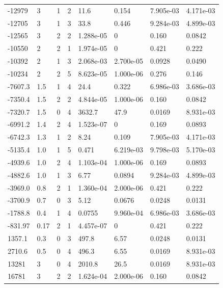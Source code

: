 \documentclass[preview]{standalone}
\begin{document}
{{\begin{tabular}{L{1.2cm}C{1.2cm} C{0.3cm}C{0.5cm} C{1.4cm}C{1.4cm} C{1.4cm}C{1.4cm}}
  -12979  &     3  & 1     &  2 &  11.6  & 0.154  & 7.905e-03 &  4.171e-03   \\ 
  -12705  &     3  & 1     &  3 &  33.8  & 0.446  & 9.284e-03 &  4.899e-03   \\ 
  -12565  &     3  & 2     &  2 &  1.288e-05  & 0  & 0.160 &  0.0842   \\ 
  -10550  &     2  & 2     &  1 &  1.974e-05  & 0  & 0.421 &  0.222   \\ 
  -10392  &     2  & 1     &  3 &  2.068e-03  & 2.700e-05  & 0.0928 &  0.0490   \\ 
  -10234  &     2  & 2     &  5 &  8.623e-05  & 1.000e-06  & 0.276 &  0.146   \\ 
  -7607.3  &   1.5  & 1     &  4 &  24.4  & 0.322  & 6.986e-03 &  3.686e-03   \\ 
  -7350.4  &   1.5  & 2     &  2 &  4.844e-05  & 1.000e-06  & 0.160 &  0.0842   \\ 
  -7320.7  &   1.5  & 0     &  4 &  3632.7  & 47.9  & 0.0169 &  8.931e-03   \\ 
  -6991.2  &   1.4  & 2     &  4 &  1.523e-07  & 0  & 0.169 &  0.0893   \\ 
  -6742.3  &   1.3  & 1     &  2 &  8.24  & 0.109  & 7.905e-03 &  4.171e-03   \\ 
  -5135.4  &   1.0  & 1     &  5 &  0.471  & 6.219e-03  & 9.798e-03 &  5.170e-03   \\ 
  -4939.6  &   1.0  & 2     &  4 &  1.103e-04  & 1.000e-06  & 0.169 &  0.0893   \\ 
  -4882.6  &   1.0  & 1     &  3 &  6.77  & 0.0894  & 9.284e-03 &  4.899e-03   \\ 
  -3969.0  &   0.8  & 2     &  1 &  1.360e-04  & 2.000e-06  & 0.421 &  0.222   \\ 
  -3700.9  &   0.7  & 0     &  3 &  5.12  & 0.0676  & 0.0248 &  0.0131   \\ 
  -1788.8  &   0.4  & 1     &  4 &  0.0755  & 9.960e-04  & 6.986e-03 &  3.686e-03   \\ 
  -831.97  &  0.17  & 2     &  1 &  4.457e-07  & 0  & 0.421 &  0.222   \\ 
  1357.1  &   0.3  & 0     &  3 &  497.8  & 6.57  & 0.0248 &  0.0131   \\ 
  2710.6  &   0.5  & 0     &  4 &  496.3  & 6.55  & 0.0169 &  8.931e-03   \\ 
  13281  &     3  & 0     &  4 &  2010.8  & 26.5  & 0.0169 &  8.931e-03   \\ 
  16781  &     3  & 2     &  2 &  1.624e-04  & 2.000e-06  & 0.160 &  0.0842   \\ 

\end{tabular}}}
\end{document}
